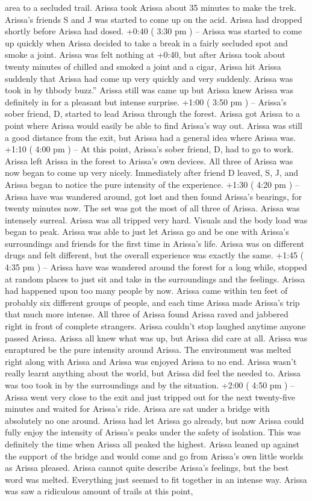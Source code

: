\documentclass[12pt]{book}
\begin{document}
area to a secluded trail. Arissa took Arissa about 35 minutes to make the trek. Arissa's friends S and J was started to come up on the acid. Arissa had dropped shortly before Arissa had dosed. +0:40 ( 3:30 pm ) -- Arissa was started to come up quickly when Arissa decided to take a break in a fairly secluded spot and smoke a joint. Arissa was felt nothing at +0:40, but after Arissa took about twenty minutes of chilled and smoked a joint and a cigar, Arissa hit Arissa suddenly that Arissa had come up very quickly and very suddenly. Arissa was took in by thbody buzz.'' Arissa still was came up but Arissa knew Arissa was definitely in for a pleasant but intense surprise. +1:00 ( 3:50 pm ) -- Arissa's sober friend, D, started to lead Arissa through the forest. Arissa got Arissa to a point where Arissa would easily be able to find Arissa's way out. Arissa was still a good distance from the exit, but Arissa had a general idea where Arissa was. +1:10 ( 4:00 pm ) -- At this point, Arissa's sober friend, D, had to go to work. Arissa left Arissa in the forest to Arissa's own devices. All three of Arissa was now began to come up very nicely. Immediately after friend D leaved, S, J, and Arissa began to notice the pure intensity of the experience. +1:30 ( 4:20 pm ) -- Arissa have was wandered around, got lost and then found Arissa's bearings, for twenty minutes now. The set was got the most of all three of Arissa. Arissa was intensely surreal. Arissa was all tripped very hard. Visuals and the body load was began to peak. Arissa was able to just let Arissa go and be one with Arissa's surroundings and friends for the first time in Arissa's life. Arissa was on different drugs and felt different, but the overall experience was exactly the same. +1:45 ( 4:35 pm ) -- Arissa have was wandered around the forest for a long while, stopped at random places to just sit and take in the surroundings and the feelings. Arissa had happened upon too many people by now. Arissa came within ten feet of probably six different groups of people, and each time Arissa made Arissa's trip that much more intense. All three of Arissa found Arissa raved and jabbered right in front of complete strangers. Arissa couldn't stop laughed anytime anyone passed Arissa. Arissa all knew what was up, but Arissa did care at all. Arissa was enraptured be the pure intensity around Arissa. The environment was melted right along with Arissa and Arissa was enjoyed Arissa to no end. Arissa wasn't really learnt anything about the world, but Arissa did feel the needed to. Arissa was too took in by the surroundings and by the situation. +2:00 ( 4:50 pm ) -- Arissa went very close to the exit and just tripped out for the next twenty-five minutes and waited for Arissa's ride. Arissa are sat under a bridge with absolutely no one around. Arissa had let Arissa go already, but now Arissa could fully enjoy the intensity of Arissa's peaks under the safety of isolation. This was definitely the time when Arissa all peaked the highest. Arissa leaned up against the support of the bridge and would come and go from Arissa's own little worlds as Arissa pleased. Arissa cannot quite describe Arissa's feelings, but the best word was melted. Everything just seemed to fit together in an intense way. Arissa was saw a ridiculous amount of trails at this point, 
\end{document}

